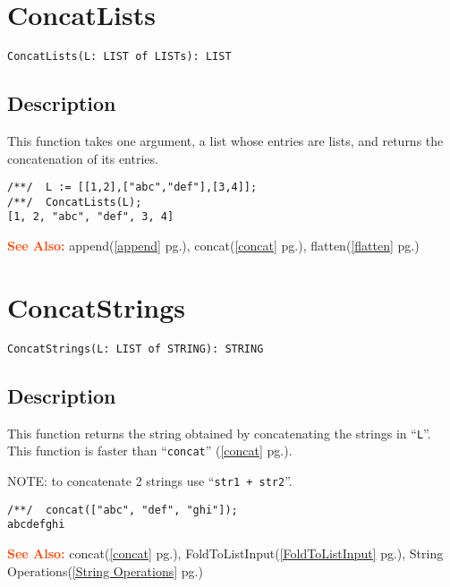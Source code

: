 \documentclass[a4paper]{mybook}
\newenvironment{command}{}{} %
\newcommand\SeeAlso{\par\textcolor{OrangeRed}{\textbf{\large See Also: }}}
\begin{document}
\section{ConcatLists}
\label{ConcatLists}
\begin{command} %


\begin{Verbatim}[label=syntax, rulecolor=\color{MidnightBlue},
frame=single]
ConcatLists(L: LIST of LISTs): LIST
\end{Verbatim}


\subsection*{Description}

This function takes one argument, a list whose entries are lists, and
returns the concatenation of its entries.
\begin{Verbatim}[label=example, rulecolor=\color{PineGreen}, frame=single]
/**/  L := [[1,2],["abc","def"],[3,4]];
/**/  ConcatLists(L);
[1, 2, "abc", "def", 3, 4]
\end{Verbatim}


\SeeAlso %
  append(\ref{append} pg.\pageref{append}), 
    concat(\ref{concat} pg.\pageref{concat}), 
    flatten(\ref{flatten} pg.\pageref{flatten})
\end{command} %

\section{ConcatStrings}
\label{ConcatStrings}
\begin{command} %


\begin{Verbatim}[label=syntax, rulecolor=\color{MidnightBlue},
frame=single]
ConcatStrings(L: LIST of STRING): STRING
\end{Verbatim}


\subsection*{Description}

This function returns the string obtained by concatenating the strings
in ``\verb&L&''.  This function is faster than ``\verb&concat&'' (\ref{concat} pg.\pageref{concat}).
\par 
NOTE: to concatenate 2 strings  use ``\verb&str1 + str2&''.
\begin{Verbatim}[label=example, rulecolor=\color{PineGreen}, frame=single]
/**/  concat(["abc", "def", "ghi"]);
abcdefghi
\end{Verbatim}


\SeeAlso %
  concat(\ref{concat} pg.\pageref{concat}), 
    FoldToListInput(\ref{FoldToListInput} pg.\pageref{FoldToListInput}), 
    String Operations(\ref{String Operations} pg.\pageref{String Operations})
\end{command} %
\end{document}
